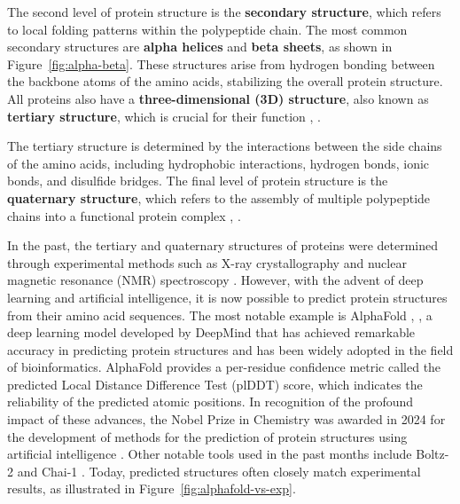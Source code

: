 The second level of protein structure is the \textbf{secondary structure}, which refers to local folding patterns within the polypeptide chain. The most common secondary structures are \textbf{alpha helices} and \textbf{beta sheets}, as shown in Figure~\ref{fig:alpha-beta}. These structures arise from hydrogen bonding between the backbone atoms of the amino acids, stabilizing the overall protein structure. All proteins also have a \textbf{three-dimensional (3D) structure}, also known as \textbf{tertiary structure}, which is crucial for their function \cite{nelson2008lehninger}, \cite{voet2010biochemistry}.

The tertiary structure is determined by the interactions between the side chains of the amino acids, including hydrophobic interactions, hydrogen bonds, ionic bonds, and disulfide bridges. The final level of protein structure is the \textbf{quaternary structure}, which refers to the assembly of multiple polypeptide chains into a functional protein complex \cite{nelson2008lehninger}, \cite{voet2010biochemistry}.

In the past, the tertiary and quaternary structures of proteins were determined through experimental methods such as X-ray crystallography and nuclear magnetic resonance (NMR) spectroscopy \cite{berman2000protein}. However, with the advent of deep learning and artificial intelligence, it is now possible to predict protein structures from their amino acid sequences. The most notable example is AlphaFold \cite{jumper2021highly}, \cite{abramson2024accurate}, a deep learning model developed by DeepMind that has achieved remarkable accuracy in predicting protein structures and has been widely adopted in the field of bioinformatics. AlphaFold provides a per-residue confidence metric called the predicted Local Distance Difference Test (plDDT) score\footnotemark[1], which indicates the reliability of the predicted atomic positions. In recognition of the profound impact of these advances, the Nobel Prize in Chemistry was awarded in 2024 for the development of methods for the prediction of protein structures using artificial intelligence \cite{abriata2024nobel}. Other notable tools used in the past months include Boltz-2 \cite{passaro2025boltz2} and Chai-1 \cite{chai2024chai}. Today, predicted structures often closely match experimental results, as illustrated in Figure~\ref{fig:alphafold-vs-exp}.



